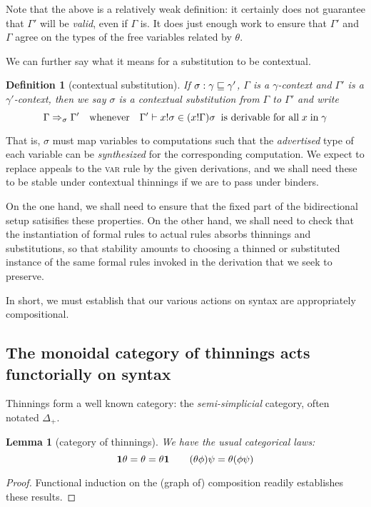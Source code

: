 \documentclass{jfp1}
\newtheorem{lemma}[theorem]{Lemma}
\newtheorem{definition}[theorem]{Definition}
\begin{document}
Note that the above is a relatively weak definition: it certainly does
not guarantee that $\Gamma'$ will be \emph{valid}, even if $\Gamma$
is. It does just enough work to ensure that $\Gamma'$ and $\Gamma$
agree on the types of the free variables related by $\theta$.

We can further say what it means for a substitution to be contextual.

\begin{definition}[contextual substitution]
  If $\sigma:\gamma\sqsubseteq\gamma'$, $\Gamma$ is a $\gamma$-context and
  $\Gamma'$ is a $\gamma'$-context, then we say $\sigma$ is a
  \emph{contextual} substitution from $\Gamma$ to $\Gamma'$ and write
  \[
    \Gamma\Rightarrow_\sigma\Gamma'\quad \mbox{whenever}\quad
    \Gamma'\vdash x!\sigma \in (x!\Gamma)\sigma\;\;\mbox{is
      derivable for all}\;x\;\mbox{in}\;\gamma
    \]
\end{definition}

That is, $\sigma$ must map variables to computations such that the
\emph{advertised} type of each variable can be \emph{synthesized}
for the corresponding computation. We expect to replace appeals
to the \textsc{var} rule by the given derivations, and we shall need
these to be stable under contextual thinnings if we are to pass under binders.

On the one hand, we shall need to ensure that the fixed part of the
bidirectional setup satisifies these properties. On the other hand,
we shall need to check that the instantiation of formal rules to
actual rules absorbs thinnings and substitutions, so that stability
amounts to choosing a thinned or substituted instance of the same
formal rules invoked in the derivation that we seek to preserve.

In short, we must establish that our various actions on syntax are
appropriately compositional.


\subsection{The monoidal category of thinnings acts functorially on syntax\label{sec:thincat}}

Thinnings form a well known category: the \emph{semi-simplicial} category, often notated $\Delta_+$.

\begin{lemma}[category of thinnings]
  We have the usual categorical laws:
  \[
    \mathbf{1}\theta = \theta = \theta\mathbf{1} \qquad
    (\theta\phi)\psi = \theta(\phi\psi)
    \]
\end{lemma}
\begin{proof}
  Functional induction on the (graph of) composition readily establishes these results.
\end{proof}
\end{document}
